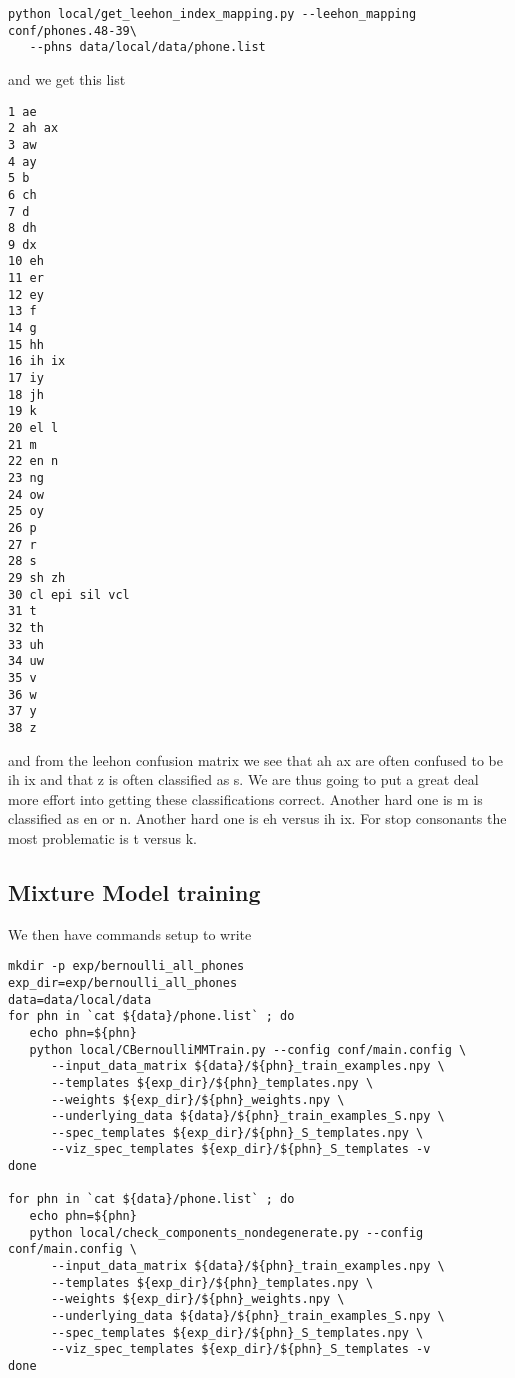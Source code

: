\documentclass{article}
\begin{document}
\begin{verbatim}
python local/get_leehon_index_mapping.py --leehon_mapping conf/phones.48-39\
   --phns data/local/data/phone.list
\end{verbatim}
and we get this list
\begin{verbatim}
1 ae
2 ah ax
3 aw
4 ay
5 b
6 ch
7 d
8 dh
9 dx
10 eh
11 er
12 ey
13 f
14 g
15 hh
16 ih ix
17 iy
18 jh
19 k
20 el l
21 m
22 en n
23 ng
24 ow
25 oy
26 p
27 r
28 s
29 sh zh
30 cl epi sil vcl
31 t
32 th
33 uh
34 uw
35 v
36 w
37 y
38 z
\end{verbatim}
and from the leehon confusion matrix we see that
ah ax are often confused to be ih ix
and that z is often classified as s. We are thus going to 
put a great deal more effort into getting these classifications
correct.  Another hard one is m is classified as en or n. Another
hard one is eh versus ih ix.  For stop consonants the most 
problematic is t versus k.



\subsection{Mixture Model training}

We then have commands setup to write
\begin{verbatim}
mkdir -p exp/bernoulli_all_phones
exp_dir=exp/bernoulli_all_phones
data=data/local/data
for phn in `cat ${data}/phone.list` ; do
   echo phn=${phn}
   python local/CBernoulliMMTrain.py --config conf/main.config \
      --input_data_matrix ${data}/${phn}_train_examples.npy \
      --templates ${exp_dir}/${phn}_templates.npy \
      --weights ${exp_dir}/${phn}_weights.npy \
      --underlying_data ${data}/${phn}_train_examples_S.npy \
      --spec_templates ${exp_dir}/${phn}_S_templates.npy \
      --viz_spec_templates ${exp_dir}/${phn}_S_templates -v
done

for phn in `cat ${data}/phone.list` ; do
   echo phn=${phn}
   python local/check_components_nondegenerate.py --config conf/main.config \
      --input_data_matrix ${data}/${phn}_train_examples.npy \
      --templates ${exp_dir}/${phn}_templates.npy \
      --weights ${exp_dir}/${phn}_weights.npy \
      --underlying_data ${data}/${phn}_train_examples_S.npy \
      --spec_templates ${exp_dir}/${phn}_S_templates.npy \
      --viz_spec_templates ${exp_dir}/${phn}_S_templates -v
done




\end{verbatim}
\end{document}
